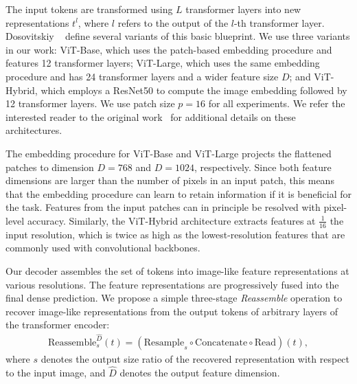 \documentclass[10pt,twocolumn,letterpaper]{article}
\begin{document}
The input tokens are transformed using $L$ transformer layers into new
representations $t^{l}$, where $l$ refers to the output of the $l$-th
transformer layer. Dosovitskiy \etal~\cite{Dosovitskiy2020} define several
variants of this basic blueprint. We use three variants in our work:
ViT-Base, which uses the patch-based embedding procedure and features 12
transformer layers; ViT-Large, which uses the same embedding procedure and has 24
transformer layers and a wider feature size $D$; and ViT-Hybrid, which employs a
ResNet50 to compute the image embedding followed by 12 transformer layers. We use patch size $p=16$ for all experiments. We refer the
interested reader to the original work~\cite{Dosovitskiy2020} for additional
details on these architectures.

The embedding procedure for ViT-Base and ViT-Large projects the flattened
patches to dimension ${D=768}$ and ${D=1024}$, respectively. Since both feature
dimensions are larger than the number of pixels in an input patch, this means
that the embedding procedure can learn to retain information if it is
beneficial for the task. Features from the input patches can in principle be resolved with
pixel-level accuracy. Similarly, the ViT-Hybrid architecture extracts
features at $\tfrac{1}{16}$ the input resolution, which is twice as high as the lowest-resolution features that are commonly used with convolutional backbones.

 Our decoder assembles the set of tokens into
image-like feature representations at various resolutions. The feature
representations are progressively fused into the final dense prediction.
We propose a simple three-stage \emph{Reassemble} operation to recover
image-like representations from the output tokens of arbitrary layers of the
transformer encoder:
\begin{align}
  \textrm{Reassemble}_{s}^{\hat D}(t) = (\textrm{Resample}_{s} \circ \textrm{Concatenate} \circ \textrm{Read})(t),\nonumber
\end{align}
where $s$ denotes the output size ratio of the recovered representation with
respect to the input image, and $\hat D$ denotes the output feature dimension.
\end{document}
